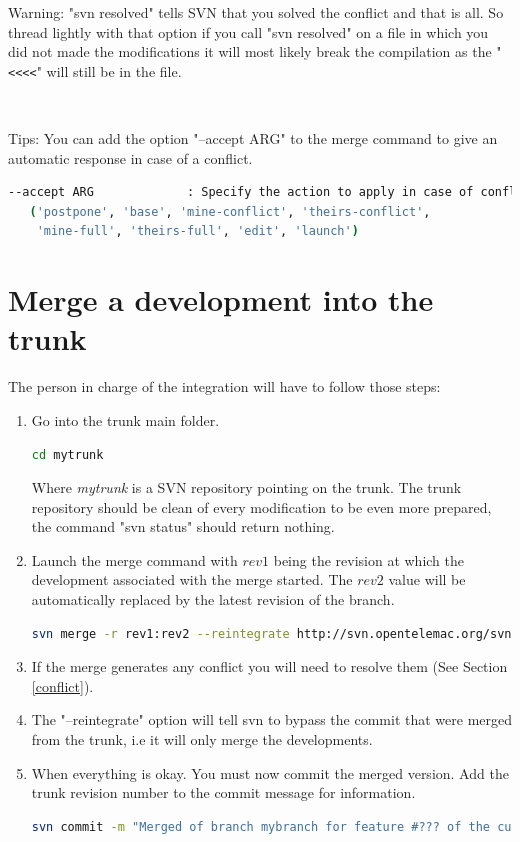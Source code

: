 \begin{WarningBlock}{Warning:}
"svn resolved" tells SVN that you solved the conflict and that is all. So
thread lightly with that option if you call "svn resolved" on a file in which you
did not made the modifications it will most likely break the compilation as the
"\verb!<<<<!" will still be in the file.\\
\end{WarningBlock}
\\
%
\begin{CommentBlock}{Tips:}
You can add the option "--accept ARG" to the merge command to give an automatic
response in case of a conflict.
\begin{lstlisting}[language=bash]
 --accept ARG             : Specify the action to apply in case of conflicts
   ('postpone', 'base', 'mine-conflict', 'theirs-conflict',
    'mine-full', 'theirs-full', 'edit', 'launch')
\end{lstlisting}
\end{CommentBlock}
%
\section{Merge a development into the trunk}
%
The person in charge of the integration will have to follow those steps:
\begin{enumerate}
\item Go into the trunk main folder.
\begin{lstlisting}[language=bash]
cd mytrunk
\end{lstlisting}
Where \textit{mytrunk} is a SVN repository pointing on the trunk. The trunk
repository should be clean of every modification to be even more prepared, the
command "svn status" should return nothing.
\item Launch the merge command with $rev1$ being the revision at which the
development associated with the merge started. The $rev2$ value will be
automatically replaced by the latest revision of the branch.
\begin{lstlisting}[language=bash]
svn merge -r rev1:rev2 --reintegrate http://svn.opentelemac.org/svn/opentelemac/branches/mybranch .
\end{lstlisting}
\item If the merge generates any conflict you will need to resolve them (See
Section \ref{conflict}).
\item The "--reintegrate" option will tell svn to bypass the commit that were
merged from the trunk, i.e it will only merge the developments.
\item When everything is okay. You must now commit the merged version. Add the
trunk revision number to the commit message for information.
\begin{lstlisting}[language=bash]
svn commit -m "Merged of branch mybranch for feature #??? of the cue"
\end{lstlisting}
\end{enumerate}
%
